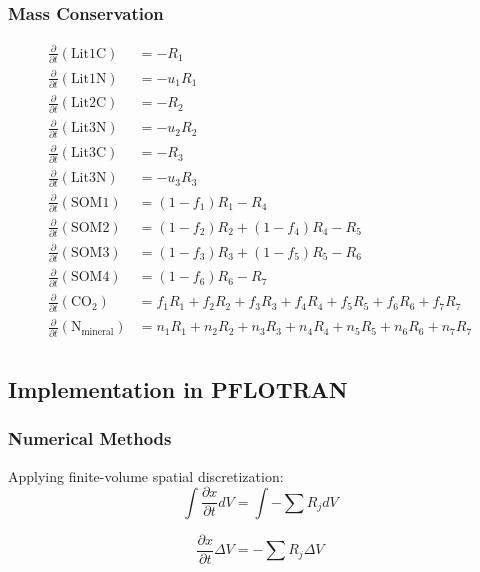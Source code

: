 \documentclass[12pt, a4paper]{article}
\begin{document}
\subsubsection{Mass Conservation}
\begin{align*}
\frac{\partial}{\partial t} \left(\text{Lit1C}\right) & =  -R_1 \\
\frac{\partial}{\partial t} \left(\text{Lit1N}\right) & =  -u_1 R_1\\
\frac{\partial}{\partial t} \left(\text{Lit2C}\right) & =  -R_2 \\
\frac{\partial}{\partial t} \left(\text{Lit3N}\right) & =  -u_2 R_2 \\
\frac{\partial}{\partial t} \left(\text{Lit3C}\right) & =  -R_3 \\
\frac{\partial}{\partial t} \left(\text{Lit3N}\right) & =  -u_3 R_3 \\
\frac{\partial}{\partial t} \left(\text{SOM1}\right) & = (1-f_1)R_1 - R_4 \\
\frac{\partial}{\partial t} \left(\text{SOM2}\right) & = (1-f_2)R_2 + (1-f_4)R_4 - R_5 \\
\frac{\partial}{\partial t} \left(\text{SOM3}\right) & = (1-f_3)R_3 + (1-f_5)R_5 - R_6 \\
\frac{\partial}{\partial t} \left(\text{SOM4}\right) & = (1-f_6)R_6 - R_7  \\
\frac{\partial}{\partial t} \left(\text{CO}_2\right) & =  f_1R_1 + f_2R_2 + f_3R_3 + f_4R_4 + f_5R_5 + f_6R_6 + f_7R_7 \\
\frac{\partial}{\partial t} \left(\text{N}_\text{mineral}\right) & = n_1R_1 + n_2R_2 + n_3R_3 +n_4R_4 +n_5R_5 +n_6R_6 + n_7R_7 \\
\end{align*}

\subsection{Implementation in PFLOTRAN}
\subsubsection{Numerical Methods}
Applying finite-volume spatial discretization:
\begin{equation}
\int \frac{\partial x}{\partial t} dV =  \int -\sum R_j dV
\end{equation}

\begin{equation}
\frac{\partial x}{\partial t} \Delta V = - \sum R_j \Delta V
\end{equation}
\end{document}
